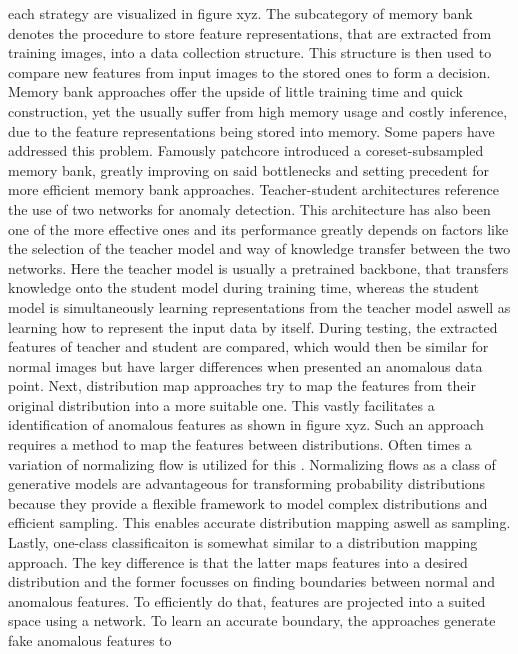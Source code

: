 each strategy are visualized in figure xyz. The subcategory of 
memory bank denotes the procedure to store feature representations, that are extracted from training images, into a data collection structure. This structure is then used to compare new 
features from input images to the stored ones to form a decision. Memory bank approaches offer the upside of little training time and quick construction, yet the usually suffer from high memory 
usage and costly inference, due to the feature representations being stored into memory. Some papers have addressed this problem. Famously patchcore \cite{patchCore2022} introduced a coreset-subsampled 
memory bank, greatly improving on said bottlenecks and setting precedent for more efficient memory bank approaches. Teacher-student architectures reference the use of two networks for anomaly detection. 
This architecture has also been one of the more effective ones and its performance greatly depends on factors like the selection of the teacher model and way 
of knowledge transfer between the two networks. Here the teacher model is usually a pretrained 
backbone, that transfers knowledge onto the student model during training time, whereas the student model is simultaneously learning representations from the teacher model aswell as learning 
how to represent the input data by itself. During testing, the extracted features of teacher and student are compared, which would then be similar for normal images but have larger differences 
when presented an anomalous data point.
Next, distribution map approaches try to map the features from their original distribution into a more suitable one. This vastly facilitates a identification of anomalous features as shown in 
figure xyz. Such an approach requires a method to map the features between distributions. Often times a variation of normalizing flow is utilized for this \cite{liu2024deep}. 
Normalizing flows as a class of generative models \cite{Kobyzev_2021normalizingflowexplanation} are advantageous for transforming probability distributions because they provide a flexible 
framework to model complex distributions and efficient sampling. This enables accurate distribution mapping aswell as sampling. 
Lastly, one-class classificaiton is 
somewhat similar to a distribution mapping approach. The key difference is that the latter maps features into a desired distribution and the former focusses on finding boundaries between normal 
and anomalous features. To efficiently do that, features are projected into a suited space using a network. To learn an accurate boundary, the approaches generate fake anomalous features to 
